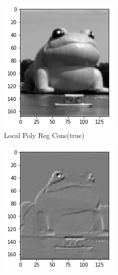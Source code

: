 \documentclass{article}
\begin{document}
\begin{figure}[htb]
  \centering
  \begin{subfigure}[b]{0.24\linewidth}
    \includegraphics[width=\linewidth]{images/poly_nr.png}
    \caption{Local Poly Reg Cons(true)}
  \end{subfigure}
  \begin{subfigure}[b]{0.24\linewidth}
    \includegraphics[width=\linewidth]{images/poly_nr_lin.png}

\end{subfigure}
\end{figure}
\end{document}
